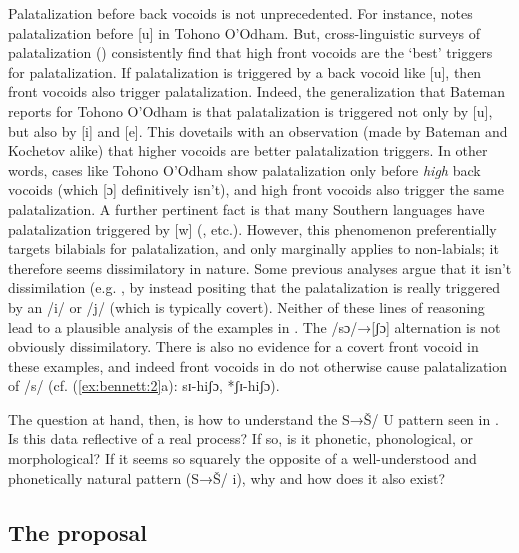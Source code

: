 Palatalization before back vocoids is not unprecedented. For instance, \citet[68]{Bateman:2007aa} notes palatalization before [u] in Tohono O’Odham. But, cross-linguistic surveys of palatalization (\citealt{Bateman:2007aa,Kochetov2011}) consistently find that high front vocoids are the ‘best’ triggers for palatalization. If palatalization is triggered by a back vocoid like [u], then front vocoids also trigger palatalization. Indeed, the generalization that Bateman reports for Tohono O’Odham is that palatalization is triggered not only by [u], but also by [i] and [e]. This dovetails with an observation (made by Bateman and Kochetov alike) that higher vocoids are better palatalization triggers. In other words, cases like Tohono O’Odham show palatalization only before \textit{high} back vocoids (which [ɔ] definitively isn’t), and high front vocoids also trigger the same palatalization.
A further pertinent fact is that many Southern  languages have palatalization triggered by [w] (\citealt{Louw1975,Ohala1978,Herbert1990,Bennett2015,Bennett&Braver2016}, etc.).  However, this phenomenon preferentially targets bilabials for palatalization, and only marginally applies to non-labials; it therefore seems dissimilatory in nature. Some previous analyses argue that it isn’t dissimilation (e.g. \citealt{Kotze&Zerbian2008}, by instead positing that the palatalization is really triggered by an /i/ or /j/ (which is typically covert). Neither of these lines of reasoning lead to a plausible analysis of the  examples in . The /sɔ/→[ʃɔ] alternation is not obviously dissimilatory. There is also no evidence for a covert front vocoid in these examples, and indeed front vocoids in  do not otherwise cause palatalization of /s/ (cf. (\ref{ex:bennett:2}a): sɪ-hiʃɔ, *ʃɪ-hiʃɔ).

The question at hand, then, is how to understand the S→Š/ {\longrule} U pattern seen in . Is this data reflective of a real process? If so, is it phonetic, phonological, or morphological? If it seems so squarely the opposite of a well-understood and phonetically natural pattern (S→Š/ {\longrule} i), why and how does it also exist?

\subsection{The proposal}\label{sec:bennett:1.2}

